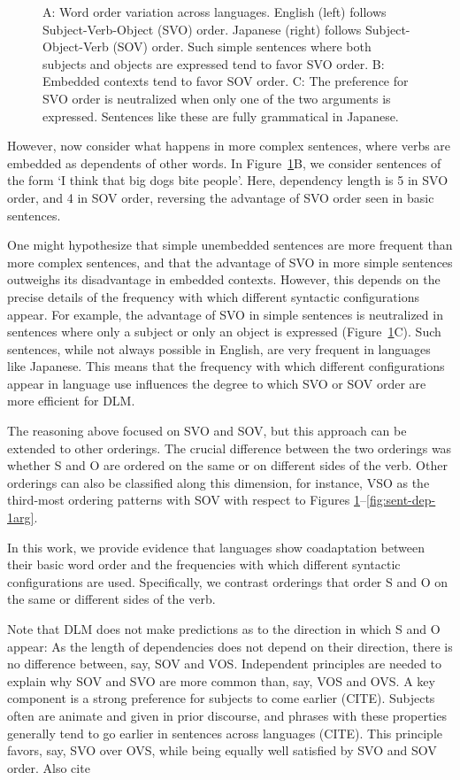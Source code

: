 \documentclass[11pt,a4paper]{article}
\begin{document}
\begin{figure}
        \caption{A: Word order variation across languages. English (left) follows Subject-Verb-Object (SVO) order. Japanese (right) follows Subject-Object-Verb (SOV) order. Such simple sentences where both subjects and objects are expressed tend to favor SVO order. B: Embedded contexts tend to favor SOV order. C: The preference for SVO order is neutralized when only one of the two arguments is expressed. Sentences like these are fully grammatical in Japanese.}
        \label{fig:sent-dep}
\end{figure}

However, now consider what happens in more complex sentences, where verbs are embedded as dependents of other words.
In Figure~\ref{fig:sent-dep}B, we consider sentences of the form `I think that big dogs bite people'.
Here, dependency length is 5 in SVO order, and 4 in SOV order, reversing the advantage  of SVO order seen in basic sentences.

One might hypothesize that simple unembedded sentences are more frequent than more complex sentences, and that the advantage of SVO in more simple sentences outweighs its disadvantage in embedded contexts.
However, this depends on the precise details of the frequency with which different syntactic configurations appear.
For example, the advantage of SVO in simple sentences is neutralized in sentences where only a subject or only an object is expressed (Figure~\ref{fig:sent-dep}C).
Such sentences, while not always possible in English, are very frequent in languages like Japanese.
This means that the frequency with which different configurations appear in language use influences the degree to which SVO or SOV order are more efficient for DLM.



The reasoning above focused on SVO and SOV, but this approach can be extended to other orderings.
The crucial difference between the two orderings was whether S and O are ordered on the same or on different sides of the verb.
Other orderings can also be classified along this dimension, for instance, VSO as the third-most ordering patterns with SOV with respect to Figures \ref{fig:sent-dep}--\ref{fig:sent-dep-1arg}.

In this work, we provide evidence that languages show coadaptation between their basic word order and the frequencies with which different syntactic configurations are used.
Specifically, we contrast orderings that order S and O on the same or different sides of the verb.

Note that DLM does not make predictions as to the direction in which S and O appear: As the length of dependencies does not depend on their direction, there is no difference between, say, SOV and VOS.
Independent principles are needed to explain why SOV and SVO are more common than, say, VOS and OVS.
A key component is a strong preference for subjects to come earlier (CITE).
Subjects often are animate and given in prior discourse, and phrases with these properties generally tend to go earlier in sentences across languages (CITE).
This principle favors, say, SVO over OVS, while being equally well satisfied by SVO and SOV order.
Also cite \cite{kemmerer2012cross-linguistic}
\end{document}
